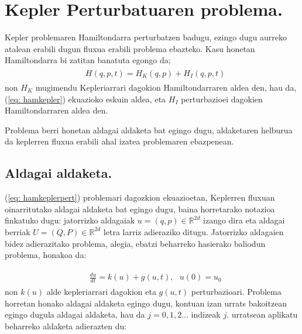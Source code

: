 \section{Kepler Perturbatuaren problema.}

Kepler problemaren Hamiltondarra perturbatzen badugu, ezingo dugu aurreko atalean erabili dugun fluxua erabili problema ebazteko. Kasu honetan Hamiltondarra  bi zatitan banatuta egongo da;
\begin{align}
\begin{split}
\label{eq: hamkeplerpert}
&H(q,p,t)=H_K(q,p)+H_I(q,p,t)
\end{split}
\end{align} 
non $H_K$ mugimendu Kepleriarrari dagokion Hamiltondarraren aldea den, hau da, (\ref{eq: hamkepler}) ekuazioko eskuin aldea, eta $H_I$ perturbazioei dagokien Hamiltondarraren aldea den.

Problema berri honetan aldagai aldaketa bat egingo dugu, aldaketaren helburua da keplerren fluxua erabili ahal izatea problemaren ebazpenean. 

\subsection*{Aldagai aldaketa.}


(\ref{eq: hamkeplerpert}) problemari dagozkion ekuazioetan, Keplerren fluxuan oinarritutako aldagai aldaketa bat egingo dugu, baina horretarako notazioa finkatuko dugu: jatorrizko aldagaiak $u=(q,p) \in \mathbb{R}^{2d}$ izango dira eta aldagai berriak $U=(Q,P) \in \mathbb{R}^{2d}$ letra larriz adieraziko ditugu. Jatorrizko aldagaien bidez adierazitako problema, alegia, ebatzi beharreko hasierako baliodun problema, honakoa da:

\begin{align}
\begin{split}
\label{eq: HamEDA}
&\frac{du}{dt} = k(u) + g(u,t),\ \ \ u(0) = u_0
\end{split}
\end{align} 
non $k(u)$ alde kepleriarrari dagokion eta $g(u,t)$ perturbazioari. 
Problema horretan honako aldagai aldaketa egingo dugu, kontuan izan urrats bakoitzean egingo dugula aldagai aldaketa, hau da $j=0, 1, 2 \ldots$ indizeak $j$. urratsean aplikatu beharreko aldaketa adierazten du:

